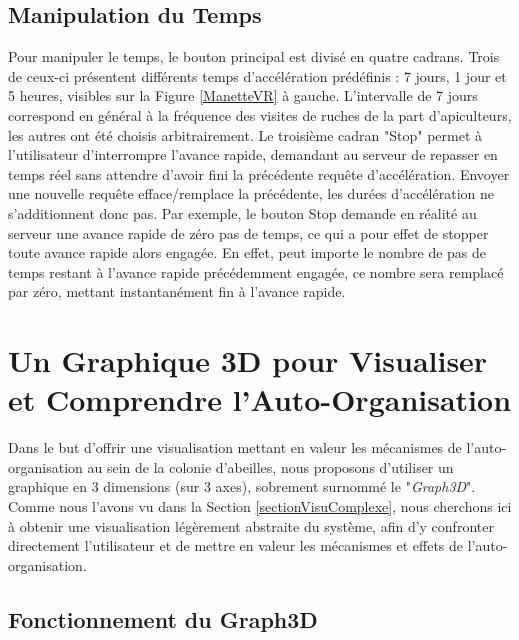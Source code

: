		\subsection{Manipulation du Temps}
		
		Pour manipuler le temps, le bouton principal est divisé en quatre cadrans. Trois de ceux-ci présentent différents temps d'accélération prédéfinis : 7 jours, 1 jour et 5 heures, visibles sur la Figure \ref{ManetteVR} à gauche. L'intervalle de 7 jours correspond en général à la fréquence des visites de ruches de la part d'apiculteurs, les autres ont été choisis arbitrairement. Le troisième cadran "Stop" permet à l'utilisateur d'interrompre l'avance rapide, demandant au serveur de repasser en temps réel sans attendre d'avoir fini la précédente requête d'accélération. Envoyer une nouvelle requête efface/remplace la précédente, les durées d'accélération ne s'additionnent donc pas. Par exemple, le bouton Stop demande en réalité au serveur une avance rapide de zéro pas de temps, ce qui a pour effet de stopper toute avance rapide alors engagée. En effet, peut importe le nombre de pas de temps restant à l'avance rapide précédemment engagée, ce nombre sera remplacé par zéro, mettant instantanément fin à l'avance rapide.
		
	\section{Un Graphique 3D pour Visualiser et Comprendre l'Auto-Organisation}
	\label{Manip3D}
		Dans le but d'offrir une visualisation mettant en valeur les mécanismes de l'auto-organisation au sein de la colonie d'abeilles, nous proposons d'utiliser un graphique en 3 dimensions (sur 3 axes), sobrement surnommé le "\textit{Graph3D}". Comme nous l'avons vu dans la Section \ref{sectionVisuComplexe}, nous cherchons ici à obtenir une visualisation légèrement abstraite du système, afin d'y confronter directement l'utilisateur et de mettre en valeur les mécanismes et effets de l'auto-organisation.
		
		\subsection{Fonctionnement du Graph3D}
		

